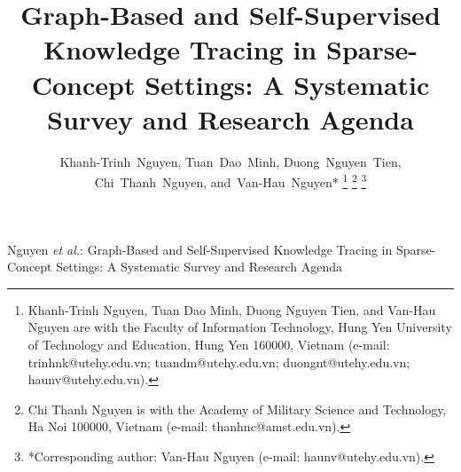 \documentclass[journal]{IEEEtran}
\begin{document}
\title{Graph-Based and Self-Supervised Knowledge Tracing in Sparse-Concept Settings: A Systematic Survey and Research Agenda}

\author{Khanh-Trinh~Nguyen, Tuan~Dao~Minh, Duong~Nguyen~Tien, Chi~Thanh~Nguyen, and~Van-Hau~Nguyen*%
\thanks{Khanh-Trinh Nguyen, Tuan Dao Minh, Duong Nguyen Tien, and Van-Hau Nguyen are with the Faculty of Information Technology, Hung Yen University of Technology and Education, Hung Yen 160000, Vietnam (e-mail: trinhnk@utehy.edu.vn; tuandm@utehy.edu.vn; duongnt@utehy.edu.vn; haunv@utehy.edu.vn).}%
\thanks{Chi Thanh Nguyen is with the Academy of Military Science and Technology, Ha Noi 100000, Vietnam (e-mail: thanhnc@amst.edu.vn).}%
\thanks{*Corresponding author: Van-Hau Nguyen (e-mail: haunv@utehy.edu.vn).}}

%
{Nguyen \MakeLowercase{\textit{et al.}}: Graph-Based and Self-Supervised Knowledge Tracing in Sparse-Concept Settings: A Systematic Survey and Research Agenda}
\end{document}
